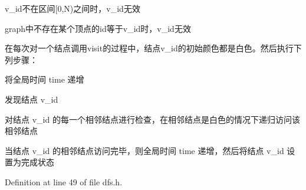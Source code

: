\begin{DoxyItemize}
\item {\ttfamily v\+\_\+id}不在区间{\ttfamily \mbox{[}0,N)}之间时，{\ttfamily v\+\_\+id}无效
\item {\ttfamily graph}中不存在某个顶点的{\ttfamily id}等于{\ttfamily v\+\_\+id}时，{\ttfamily v\+\_\+id}无效
\end{DoxyItemize}

在每次对一个结点调用visit的过程中，结点v\+\_\+id的初始颜色都是白色。然后执行下列步骤：


\begin{DoxyItemize}
\item 将全局时间 time 递增
\item 发现结点 v\+\_\+id
\item 对结点 v\+\_\+id 的每一个相邻结点进行检查，在相邻结点是白色的情况下递归访问该相邻结点
\item 当结点 v\+\_\+id 的相邻结点访问完毕，则全局时间 time 递增，然后将结点 v\+\_\+id 设置为完成状态 
\end{DoxyItemize}

Definition at line 49 of file dfs.\+h.

